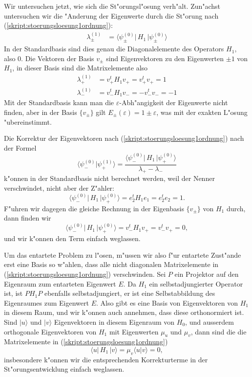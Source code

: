 \begin{beispiel}
Wir untersuchen jetzt, wie sich die St"orungsl"osung verh"alt.
Zun"achst untersuchen wir die "Anderung der Eigenwerte durch die
St"orung nach (\ref{skript:stoerungsloesung1ordnung}):
\begin{align*}
\lambda_{\pm}^{(1)}
&=
\langle \psi_{\pm}^{(0)}|\, H_1 \,|\psi_{\pm}^{(0)}\rangle
\end{align*}
In der Standardbasis sind dies genau die Diagonalelemente des Operators $H_1$,
also $0$.
Die Vektoren der Basis $v_\pm$ sind Eigenvektoren zu den Eigenwerten
$\pm1$ von $H_1$, in dieser Basis sind die Matrixelemente also
\begin{align*}
\lambda_+^{(1)}
&=
v_+^tH_1v_+=v_+^tv_+=1\\
\lambda_-^{(1)}
&=
v_-^tH_1v_-=-v_-^tv_-=-1
\end{align*}
Mit der Standardbasis kann man die $\varepsilon$-Abh"angigkeit der
Eigenwerte nicht finden, aber in der Basis $\{v_\pm\}$ gilt
$E_\pm(\varepsilon)=1\pm\varepsilon$, was mit der exakten L"osung
"ubereinstimmt.

Die Korrektur der Eigenvektoren nach (\ref{skript:stoerungsloesung1ordnung})
nach der Formel
\[
\langle\psi_-^{(0)}|\psi_+^{(1)}\rangle
=
\frac{
\langle\psi_-^{(0)}|\,H_1\,|\psi_+^{(0)}\rangle
}{
\lambda_+-\lambda_-
}
\]
k"onnen in der Standardbasis nicht berechnet werden, weil der Nenner
verschwindet, nicht aber der Z"ahler:
\[
\langle\psi_-^{(0)}|\,H_1\,|\psi_+^{(0)}\rangle
=
e_2^tH_1e_1=e_2^te_2=1.
\]
F"uhren wir dagegen die gleiche Rechnung in der Eigenbasis $\{v_\pm\}$
von $H_1$ durch, dann finden wir
\[
\langle\psi_-^{(0)}|\,H_1\,|\psi_+^{(0)}\rangle
=
v_-^tH_1v_+=v_-^tv_+=0,
\]
und wir k"onnen den Term einfach weglassen.
\end{beispiel}

Um das entartete Problem zu l"osen, m"ussen wir also f"ur entartete
Zust"ande erst eine Basis so w"ahlen, dass alle nicht
diagonalen Matrixelemente in (\ref{skript:stoerungsloesung1ordnung}) verschwinden.
Sei $P$ ein Projektor auf den Eigenraum zum entarteten Eigenwert $E$.
Da $H_1$ ein selbstadjungierter Operator ist, ist $PH_1P$ ebenfalls
selbstadjungiert, er ist eine Selbstabbildung des
Eigenraumes zum Eigenwert $E$.
Also gibt es eine Basis von Eigenvektoren von $H_1$ in diesem Raum,
und wir k"onnen auch annehmen, dass diese orthonormiert ist.
Sind $|u\rangle$ und $|v\rangle$ Eigenvektoren in diesem Eigenraum von
$H_0$, und ausserdem orthogonale Eigenvektoren von $H_1$ mit Eigenwerten
$\mu_u$ und $\mu_v$, dann sind die
die Matrixelemente in (\ref{skript:stoerungsloesung1ordnung}) 
\[
\langle u|\,H_1\,|v\rangle = \mu_v\langle u|v\rangle=0,
\]
insbesondere k"onnen wir die entsprechenden Korrekturterme in der
St"orungsentwicklung einfach weglassen.


